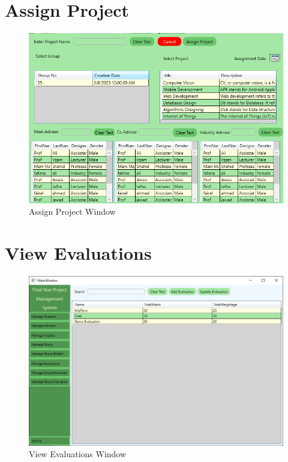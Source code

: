\documentclass[a4paper, 12pt, oneside]{uet_thesis}
\begin{document}
\section{Assign Project}
\begin{figure}[h]
    \centering
    \includegraphics[width=1\textwidth]{Figures/AddAssignProject.png}
    \caption{Assign Project Window}
    \label{fig:my_label}
\end{figure}
\clearpage


\section{View Evaluations}
\begin{figure}[h]
    \centering
    \includegraphics[width=1\textwidth]{Figures/ViewEvaluations.png}
    \caption{View Evaluations Window}
    \label{fig:my_label}
\end{figure}
\end{document}
